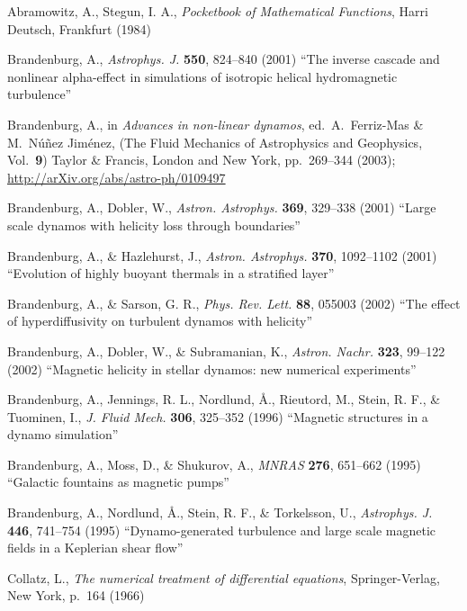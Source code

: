 \documentclass[\mydriver,12pt,twoside,notitlepage,a4paper]{article}
\begin{document}

\begin{thebibliography}{99}

 Abramowitz, A., Stegun, I. A.,
  \emph{Pocketbook of Mathematical Functions\/},
  Harri Deutsch, Frankfurt (1984)

 Brandenburg, A.,
  \emph{Astrophys. J.} \textbf{550}, 824--840 (2001)
  ``The inverse cascade and nonlinear alpha-effect in simulations
  of isotropic helical hydromagnetic turbulence''

 Brandenburg, A., in \emph{Advances in non-linear dynamos},
  ed.\ A.\ Ferriz-Mas \& M.\ N\'u\~nez Jim\'enez,
  (The Fluid Mechanics of Astrophysics and Geophysics, Vol.\ {\bf9})
  Taylor \& Francis, London and New York, pp.~269--344 (2003);
  \url{http://arXiv.org/abs/astro-ph/0109497}

 Brandenburg, A., Dobler, W.,
  \emph{Astron. Astrophys.} \textbf{369}, 329--338 (2001)
  ``Large scale dynamos with helicity loss through boundaries''

 Brandenburg, A., \& Hazlehurst, J.,
  \emph{Astron. Astrophys.} \textbf{370}, 1092--1102 (2001)
  ``Evolution of highly buoyant thermals in a stratified layer''

 Brandenburg, A., \& Sarson, G. R.,
  \emph{Phys. Rev. Lett.} \textbf{88}, 055003 (2002)
  ``The effect of hyperdiffusivity on turbulent dynamos with helicity''

Brandenburg, A., Dobler, W., \& Subramanian, K.,
  \emph{Astron. Nachr.} \textbf{323}, 99--122 (2002)
  ``Magnetic helicity in stellar dynamos: new numerical experiments''

 Brandenburg, A., Jennings, R. L., Nordlund, \AA.,
  Rieutord, M., Stein, R. F., \& Tuominen, I.,
  \emph{J. Fluid Mech.} \textbf{306}, 325--352 (1996)
  ``Magnetic structures in a dynamo simulation''

Brandenburg, A., Moss, D., \& Shukurov, A.,
  \emph{MNRAS} \textbf{276}, 651--662 (1995)
  ``Galactic fountains as magnetic pumps''

 Brandenburg, A., Nordlund, \AA., Stein, R. F.,
  \& Torkelsson, U.,
  \emph{Astrophys. J.} \textbf{446}, 741--754 (1995)
  ``Dynamo-generated turbulence and large scale magnetic fields
  in a Keplerian shear flow''

Collatz, L.,
  \emph{The numerical treatment of differential equations},
  Springer-Verlag, New York, p.\ 164 (1966)


\end{thebibliography}
\end{document}
